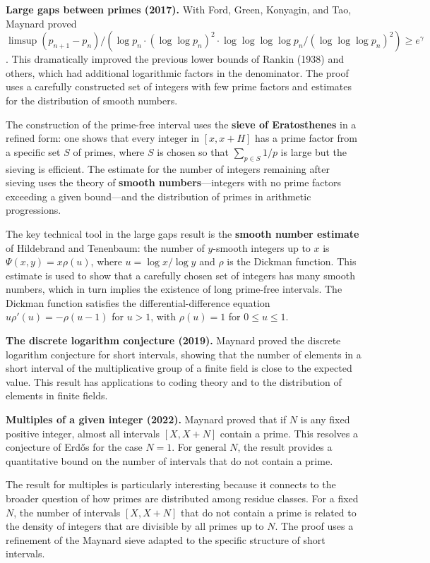 \textbf{Large gaps between primes (2017).} With Ford, Green, Konyagin, and Tao, Maynard proved $\limsup (p_{n+1} - p_n) / (\log p_n \cdot (\log\log p_n)^2 \cdot \log\log\log\log p_n / (\log\log\log p_n)^2) \ge e^\gamma$. This dramatically improved the previous lower bounds of Rankin (1938) and others, which had additional logarithmic factors in the denominator. The proof uses a carefully constructed set of integers with few prime factors and estimates for the distribution of smooth numbers.

The construction of the prime-free interval uses the \textbf{sieve of Eratosthenes} in a refined form: one shows that every integer in $[x, x+H]$ has a prime factor from a specific set $S$ of primes, where $S$ is chosen so that $\sum_{p \in S} 1/p$ is large but the sieving is efficient. The estimate for the number of integers remaining after sieving uses the theory of \textbf{smooth numbers}---integers with no prime factors exceeding a given bound---and the distribution of primes in arithmetic progressions.

The key technical tool in the large gaps result is the \textbf{smooth number estimate} of Hildebrand and Tenenbaum: the number of $y$-smooth integers up to $x$ is $\Psi(x, y) = x \rho(u)$, where $u = \log x / \log y$ and $\rho$ is the Dickman function. This estimate is used to show that a carefully chosen set of integers has many smooth numbers, which in turn implies the existence of long prime-free intervals. The Dickman function satisfies the differential-difference equation $u \rho'(u) = -\rho(u-1)$ for $u > 1$, with $\rho(u) = 1$ for $0 \le u \le 1$.

\textbf{The discrete logarithm conjecture (2019).} Maynard proved the discrete logarithm conjecture for short intervals, showing that the number of elements in a short interval of the multiplicative group of a finite field is close to the expected value. This result has applications to coding theory and to the distribution of elements in finite fields.

\textbf{Multiples of a given integer (2022).} Maynard proved that if $N$ is any fixed positive integer, almost all intervals $[X, X + N]$ contain a prime. This resolves a conjecture of Erd\H{o}s for the case $N = 1$. For general $N$, the result provides a quantitative bound on the number of intervals that do not contain a prime.

The result for multiples is particularly interesting because it connects to the broader question of how primes are distributed among residue classes. For a fixed $N$, the number of intervals $[X, X+N]$ that do not contain a prime is related to the density of integers that are divisible by all primes up to $N$. The proof uses a refinement of the Maynard sieve adapted to the specific structure of short intervals.

